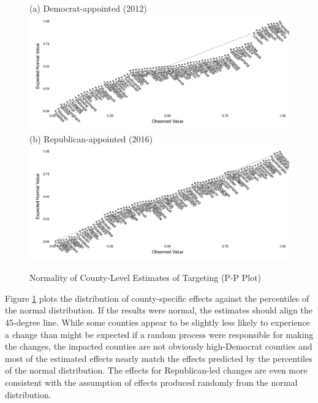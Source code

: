 \documentclass[12pt]{article}
\begin{document}
\begin{figure}[h!]
	\begin{center}
	\caption{Normality of County-Level Estimates of Targeting (P-P Plot)}\label{figure_normalitytests_pp}
		\small \vspace*{.05in}
		\smallskip

    (a) Democrat-appointed (2012)\\
		\includegraphics[width=6.2in]{../../50_results_full/county_point_estimate_pnorm_pp_has_changed_2012.pdf}  \\

    \smallskip
    (b) Republican-appointed (2016)\\
    \includegraphics[width=6.2in]{../../50_results_full/county_point_estimate_pnorm_pp_has_changed_2016.pdf}

		\end{center}
\end{figure} \normalsize

Figure \ref{figure_normalitytests_pp} plots the distribution of county-specific effects against the percentiles of the normal distribution.  If the results were normal, the estimates should align the 45-degree line.  While some counties appear to be slightly less likely to experience a change than might be expected if a random process were responsible for making the changes, the impacted counties are not obviously high-Democrat counties and most of the estimated effects nearly match the effects predicted by the percentiles of the normal distribution.  The effects for Republican-led changes are even more consistent with the assumption of effects produced randomly from the normal distribution.
\end{document}
